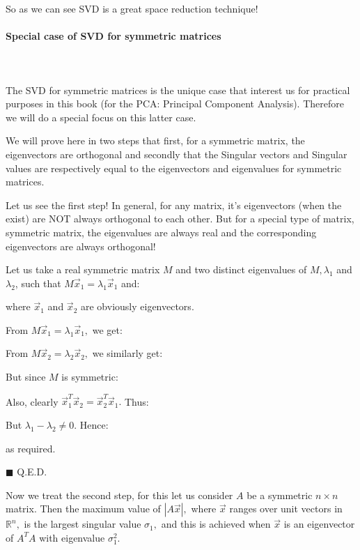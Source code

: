 	So as we can see SVD is a great space reduction technique!
	
	\paragraph{Special case of SVD for symmetric matrices}\mbox{}\\\\
	The SVD for symmetric matrices is the unique case that interest us for practical purposes in this book (for the PCA: Principal Component Analysis). Therefore we will do a special focus on this latter case.
	
	We will prove here in two steps that first, for a symmetric matrix, the eigenvectors are orthogonal and secondly that the Singular vectors and Singular values are respectively equal to the eigenvectors and eigenvalues for symmetric matrices.
	
	Let us see the first step! In general, for any matrix, it's eigenvectors (when the exist) are NOT always orthogonal to each other. But for a special type of matrix, symmetric matrix, the eigenvalues are always real and the corresponding eigenvectors are always orthogonal!
	
	\begin{dem}
	Let us take a real symmetric matrix $M$ and two distinct eigenvalues of $M, \lambda_{1}$ and $\lambda_{2}$, such that $M \vec{x}_{1}=\lambda_{1} \vec{x}_{1}$ and:
	
	where $\vec{x}_{1}$ and $\vec{x}_{2}$ are obviously eigenvectors.

	From $M \vec{x}_{1}=\lambda_{1} \vec{x}_{1},$ we get:
	
	From $M \vec{x}_{2}=\lambda_{2} \vec{x}_{2},$ we similarly get:
	
	But since $M$ is symmetric:
	
	Also, clearly $\vec{x}_{1}^{T} \vec{x}_{2}=\vec{x}_{2}^{T} \vec{x}_{1} .$ Thus: 
	
	But $\lambda_{1}-\lambda_{2} \neq 0$. Hence:
	
	as required.
	\begin{flushright}
		$\blacksquare$  Q.E.D.
	\end{flushright}
	\end{dem}
	Now we treat the second step, for this let us consider $A$ be a symmetric $n \times n$ matrix. Then the maximum value of $|A \vec{x}|,$ where $\vec{x}$ ranges over unit vectors in $\mathbb{R}^{n},$ is the largest singular value $\sigma_{1},$ and this is achieved when $\vec{x}$ is an eigenvector of $A^{T} A$ with eigenvalue $\sigma_{1}^{2}$.
	
